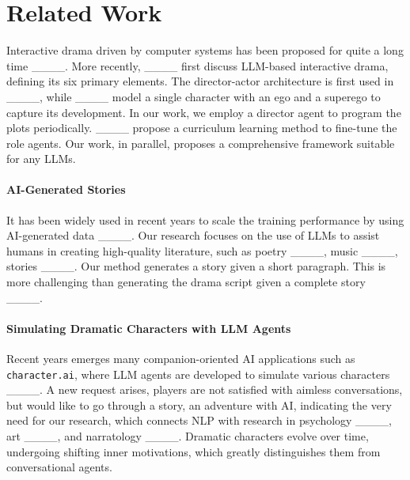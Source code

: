 \section{Related Work}
Interactive drama driven by computer systems has been proposed for quite a long time ____.
More recently, ____ first discuss LLM-based interactive drama, defining its six primary elements. The director-actor architecture is first used in ____, while ____ model a single character with an ego and a superego to capture its development. In our work, we employ a director agent to program the plots periodically. ____ propose a curriculum learning method to fine-tune the role agents. Our work, in parallel, proposes a comprehensive framework suitable for any LLMs.

\paragraph{AI-Generated Stories}
It has been widely used in recent years to scale the training performance by using AI-generated data ____.
Our research focuses on the use of LLMs to assist humans in creating high-quality literature, such as poetry ____, music ____, stories ____. Our method generates a story given a short paragraph. This is more challenging than generating the drama script given a complete story ____.

\paragraph{Simulating Dramatic Characters with LLM Agents}
Recent years emerges many companion-oriented AI applications such as \texttt{character.ai}, where LLM agents are developed to simulate various characters ____. A new request arises, players are not satisfied with aimless conversations, but would like to go through a story, an adventure with AI, indicating the very need for our research, which connects NLP with research in psychology ____, art ____, and narratology ____.
Dramatic characters evolve over time, undergoing shifting inner motivations, which greatly distinguishes them from conversational agents.